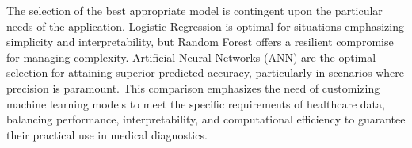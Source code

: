 The selection of the best appropriate model is contingent upon the particular needs of the application. Logistic Regression is optimal for situations emphasizing simplicity and interpretability, but Random Forest offers a resilient compromise for managing complexity. Artificial Neural Networks (ANN) are the optimal selection for attaining superior predicted accuracy, particularly in scenarios where precision is paramount. This comparison emphasizes the need of customizing machine learning models to meet the specific requirements of healthcare data, balancing performance, interpretability, and computational efficiency to guarantee their practical use in medical diagnostics.